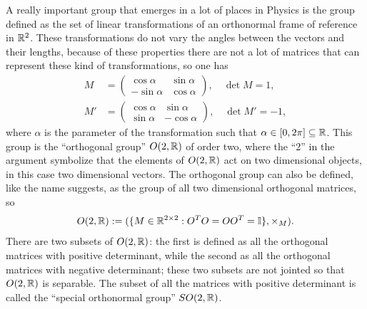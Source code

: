 A really important group that emerges in a lot of places in Physics is the group defined as the set of linear transformations of an orthonormal frame of reference in $\mathbb{R}^2$. These transformations do not vary the angles between the vectors and their lengths, because of these properties there are not a lot of matrices that can represent these kind of transformations, so one has
\begin{align}
    M &= 
    \begin{pmatrix}
        \cos{\alpha} & \sin{\alpha} \\
        -\sin{\alpha} & \cos{\alpha}
    \end{pmatrix}
    ,\quad \det{M} = 1, \\
    M' &= 
    \begin{pmatrix}
        \cos{\alpha} & \sin{\alpha} \\
        \sin{\alpha} & -\cos{\alpha}
    \end{pmatrix}
    ,\quad \det{M'} = -1,
\end{align}
where $\alpha$ is the parameter of the transformation such that $\alpha \in [0,2\pi] \subseteq \mathbb{R}$. This group is the ``orthogonal group'' $O(2,\mathbb{R})$ of order two, where the ``2'' in the argument symbolize that the elements of $O(2,\mathbb{R})$ act on two dimensional objects, in this case two dimensional vectors. The orthogonal group can also be defined, like the name suggests, as the group of all two dimensional orthogonal matrices, so 
\begin{equation}
    O(2,\mathbb{R}) := (\{M \in \mathbb{R}^{2\times 2} : O^TO = OO^T = \mathbb{I}\},\times_M).
\end{equation}
There are two subsets of $O(2,\mathbb{R})$: the first is defined as all the orthogonal matrices with positive determinant, while the second as all the orthogonal matrices with negative determinant; these two subsets are not jointed so that $O(2,\mathbb{R})$ is separable. The subset of all the matrices with positive determinant is called the ``special orthonormal group'' $SO(2,\mathbb{R})$.

